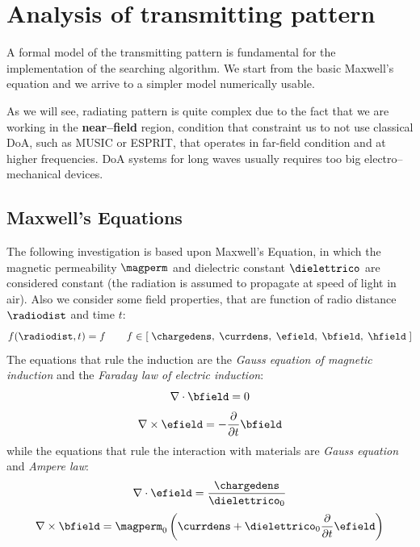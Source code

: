 \section{Analysis of transmitting pattern}

A formal model of the transmitting pattern is fundamental for the implementation of the searching algorithm. We start from the basic Maxwell's equation and we arrive to a simpler model numerically usable.

As we will see, radiating pattern is quite complex due to the fact that we are working in the \textbf{near--field} region, condition that constraint us to not use classical DoA, such as MUSIC or ESPRIT, that operates in far-field condition and at higher frequencies. DoA systems for long waves usually requires too big electro--mechanical devices.

\subsection{Maxwell's Equations}
The following investigation is based upon Maxwell's Equation, in which the magnetic permeability $\magperm$ and dielectric constant $\dielettrico$ are considered constant (the radiation is assumed to propagate at speed of light in air). Also we consider some field properties, that are function of radio distance $\radiodist$ and time $t$:
\[
f(\radiodist,t) = f \qquad f \in \left[\; \chargedens,\; \currdens,\; \efield,\; \bfield,\; \hfield \; \right]
\]
The equations that rule the induction are the \emph{Gauss equation of magnetic induction} and the \emph{Faraday law of electric induction}:
\begin{equation}
\nabla\cdot\bfield = 0
\label{eq:gauss1}
\end{equation}
\begin{equation}
\nabla\times\efield = -\partialt \bfield
\label{eq:faraday}
\end{equation}
while the equations that rule the interaction with materials are \emph{Gauss equation} and \emph{Ampere law}:
\begin{equation}
\nabla\cdot\efield = \dfrac{\chargedens}{{\dielettrico}_0}
\label{eq:gauss2}
\end{equation}
\begin{equation}
\nabla\times\bfield = {\magperm}_0 \left( \currdens + {\dielettrico}_0 \partialt \efield \right)
\label{eq:ampere}
\end{equation}

